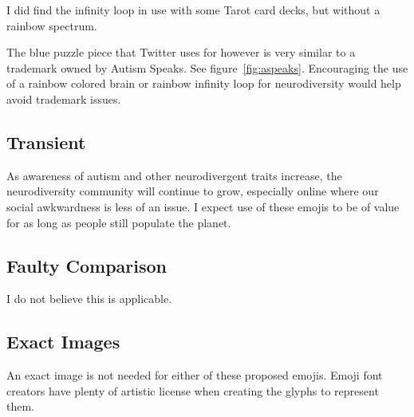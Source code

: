 I did find the infinity loop in use with some Tarot card decks, but without a rainbow spectrum.

The blue puzzle piece that Twitter uses for \jigsawemoji{} however is very
similar to a trademark owned by Autism Speaks. See figure~\ref{fig:aspeaks}. Encouraging the
use of a rainbow colored brain or rainbow infinity loop for neurodiversity would help avoid
trademark issues.

\subsection{Transient}

As awareness of autism and other neurodivergent traits increase, the neurodiversity community
will continue to grow, especially online where our social awkwardness is less of an issue. I
expect use of these emojis to be of value for as long as people still populate the planet.

\subsection{Faulty Comparison}

I do not believe this is applicable.

\subsection{Exact Images}

An exact image is not needed for either of these proposed emojis. Emoji font creators have plenty
of artistic license when creating the glyphs to represent them.
